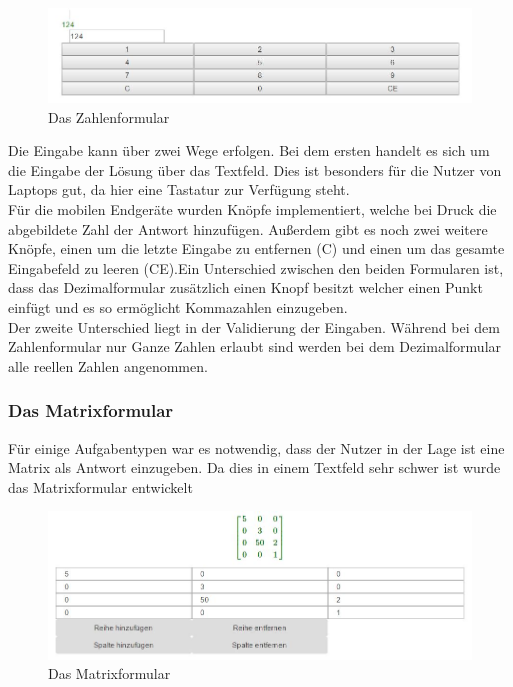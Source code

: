 \begin{enumerate}
\begin{figure}[htp]     %
\centering
\includegraphics[width=1\textwidth]{bilder/NumberForm} 
\caption[Das Zahlenformular]{Das Zahlenformular}
\end{figure} 

Die Eingabe kann über zwei Wege erfolgen. Bei dem ersten handelt es sich um die Eingabe der Lösung über das Textfeld. Dies ist besonders für die Nutzer von Laptops gut, da hier eine Tastatur zur Verfügung steht. \\
Für die mobilen Endgeräte wurden Knöpfe implementiert, welche bei Druck die abgebildete Zahl der Antwort hinzufügen. Außerdem gibt es noch zwei weitere Knöpfe, einen um die letzte Eingabe zu entfernen (C) und einen um das gesamte Eingabefeld zu leeren (CE).Ein Unterschied zwischen den beiden Formularen ist, dass das Dezimalformular zusätzlich einen Knopf besitzt welcher einen Punkt einfügt und es so ermöglicht Kommazahlen einzugeben. \\
Der zweite Unterschied liegt in der Validierung der Eingaben. Während bei dem Zahlenformular nur Ganze Zahlen erlaubt sind werden bei dem Dezimalformular alle reellen Zahlen angenommen.

\subsubsection{Das Matrixformular}

Für einige Aufgabentypen war es notwendig, dass der Nutzer in der Lage ist eine Matrix als Antwort einzugeben. Da dies in einem Textfeld sehr schwer ist wurde das Matrixformular entwickelt

\begin{figure}[htp]     %
\centering
\includegraphics[width=1\textwidth]{bilder/MatrixForm} 
\caption[Das Matrixformular]{Das Matrixformular}


\end{figure}
\end{enumerate}
